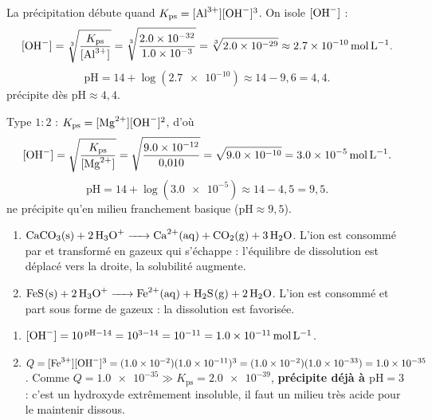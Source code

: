 \documentclass[11pt,a4paper]{article}
\begin{document}
\begin{corrige}
La précipitation débute quand $K_{\mathrm{ps}}=[\ce{Al^{3+}}][\ce{OH-}]^{3}$. On isole $[\ce{OH-}]$ :
\[ [\ce{OH-}] = \sqrt[3]{\dfrac{K_{\mathrm{ps}}}{[\ce{Al^{3+}}]}}
             = \sqrt[3]{\dfrac{\num{2.0e-32}}{\num{1.0e-3}}} = \sqrt[3]{\num{2.0e-29}}
             \approx \qty{2.7e-10}{\mole\per\litre}. \]
\[ \mathrm{pH} = 14 + \log(\num{2.7e-10}) \approx 14 - 9{,}6 = 4{,}4. \]
 précipite dès $\mathrm{pH}\approx 4{,}4$.
\end{corrige}

\begin{corrige}
Type $1{:}2$ : $K_{\mathrm{ps}}=[\ce{Mg^{2+}}][\ce{OH-}]^{2}$, d'où
\[ [\ce{OH-}] = \sqrt{\dfrac{K_{\mathrm{ps}}}{[\ce{Mg^{2+}}]}}
             = \sqrt{\dfrac{\num{9.0e-12}}{0{,}010}} = \sqrt{\num{9.0e-10}} = \qty{3.0e-5}{\mole\per\litre}. \]
\[ \mathrm{pH} = 14 + \log(\num{3.0e-5}) \approx 14 - 4{,}5 = 9{,}5. \]
 ne précipite qu'en milieu franchement basique ($\mathrm{pH}\approx 9{,}5$).
\end{corrige}

\begin{corrige}
\begin{enumerate}[label=\alph*)]
  \item $\ce{CaCO3(s) + 2 H3O+ -> Ca^{2+}(aq) + CO2(g) + 3 H2O}$. L'ion  est consommé par
         et transformé en  gazeux qui s'échappe : l'équilibre de dissolution est
        déplacé vers la droite, la solubilité augmente.
  \item $\ce{FeS(s) + 2 H3O+ -> Fe^{2+}(aq) + H2S(g) + 2 H2O}$. L'ion  est consommé et
        part sous forme de  gazeux : la dissolution est favorisée.
\end{enumerate}
\end{corrige}

\begin{corrige}[\ce{Fe(OH)3} précipite-t-il à pH $=3$ ?]
\begin{enumerate}[label=\alph*)]
  \item $[\ce{OH-}] = 10^{\,\mathrm{pH}-14} = 10^{3-14} = 10^{-11} = \qty{1.0e-11}{\mole\per\litre}$.
  \item $Q = [\ce{Fe^{3+}}][\ce{OH-}]^{3} = (\num{1.0e-2})(\num{1.0e-11})^{3}
           = (\num{1.0e-2})(\num{1.0e-33}) = \num{1.0e-35}$. Comme
        $Q=\num{1.0e-35} \gg K_{\mathrm{ps}}=\num{2.0e-39}$,  \textbf{précipite déjà à
        $\mathrm{pH}=3$} : c'est un hydroxyde extrêmement insoluble, il faut un milieu très acide pour
        le maintenir dissous.
\end{enumerate}
\end{corrige}
\end{document}
